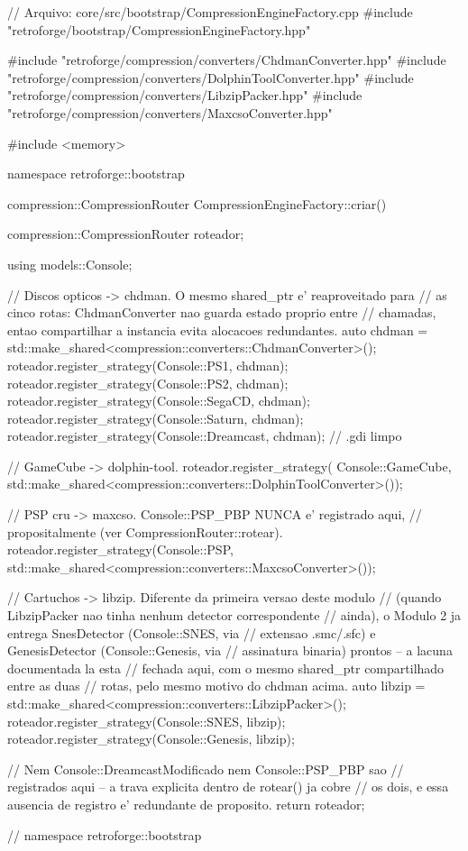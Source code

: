 \begin{CaixaCodigo}
// Arquivo: core/src/bootstrap/CompressionEngineFactory.cpp
#include "retroforge/bootstrap/CompressionEngineFactory.hpp"

#include "retroforge/compression/converters/ChdmanConverter.hpp"
#include "retroforge/compression/converters/DolphinToolConverter.hpp"
#include "retroforge/compression/converters/LibzipPacker.hpp"
#include "retroforge/compression/converters/MaxcsoConverter.hpp"

#include <memory>

namespace retroforge::bootstrap {

compression::CompressionRouter CompressionEngineFactory::criar() {
    compression::CompressionRouter roteador;

    using models::Console;

    // Discos opticos -> chdman. O mesmo shared_ptr e' reaproveitado para
    // as cinco rotas: ChdmanConverter nao guarda estado proprio entre
    // chamadas, entao compartilhar a instancia evita alocacoes redundantes.
    auto chdman = std::make_shared<compression::converters::ChdmanConverter>();
    roteador.register_strategy(Console::PS1, chdman);
    roteador.register_strategy(Console::PS2, chdman);
    roteador.register_strategy(Console::SegaCD, chdman);
    roteador.register_strategy(Console::Saturn, chdman);
    roteador.register_strategy(Console::Dreamcast, chdman); // .gdi limpo

    // GameCube -> dolphin-tool.
    roteador.register_strategy(
        Console::GameCube, std::make_shared<compression::converters::DolphinToolConverter>());

    // PSP cru -> maxcso. Console::PSP_PBP NUNCA e' registrado aqui,
    // propositalmente (ver CompressionRouter::rotear).
    roteador.register_strategy(Console::PSP,
                                std::make_shared<compression::converters::MaxcsoConverter>());

    // Cartuchos -> libzip. Diferente da primeira versao deste modulo
    // (quando LibzipPacker nao tinha nenhum detector correspondente
    // ainda), o Modulo 2 ja entrega SnesDetector (Console::SNES, via
    // extensao .smc/.sfc) e GenesisDetector (Console::Genesis, via
    // assinatura binaria) prontos -- a lacuna documentada la esta
    // fechada aqui, com o mesmo shared_ptr compartilhado entre as duas
    // rotas, pelo mesmo motivo do chdman acima.
    auto libzip = std::make_shared<compression::converters::LibzipPacker>();
    roteador.register_strategy(Console::SNES, libzip);
    roteador.register_strategy(Console::Genesis, libzip);

    // Nem Console::DreamcastModificado nem Console::PSP_PBP sao
    // registrados aqui -- a trava explicita dentro de rotear() ja cobre
    // os dois, e essa ausencia de registro e' redundante de proposito.
    return roteador;
}

} // namespace retroforge::bootstrap
\end{CaixaCodigo}

